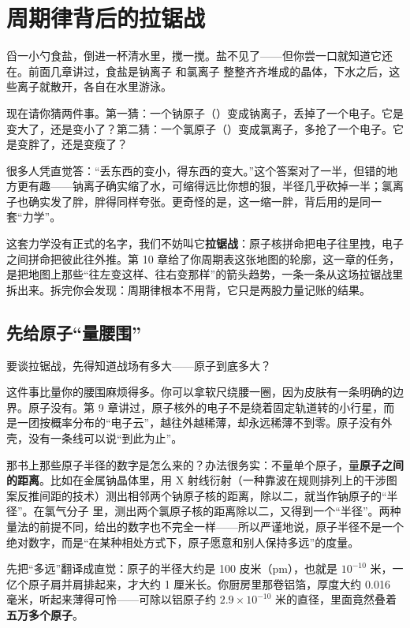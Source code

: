 \chapter{周期律背后的拉锯战}

\begin{kaichang}
舀一小勺食盐，倒进一杯清水里，搅一搅。盐不见了——但你尝一口就知道它还在。前面几章讲过，食盐是钠离子  和氯离子  整整齐齐堆成的晶体，下水之后，这些离子就散开，各自在水里游泳。

现在请你猜两件事。第一猜：一个钠原子（）变成钠离子，丢掉了一个电子。它是变大了，还是变小了？第二猜：一个氯原子（）变成氯离子，多抢了一个电子。它是变胖了，还是变瘦了？

很多人凭直觉答：“丢东西的变小，得东西的变大。”这个答案对了一半，但错的地方更有趣——钠离子确实缩了水，可缩得远比你想的狠，半径几乎砍掉一半；氯离子也确实发了胖，胖得同样夸张。更奇怪的是，这一缩一胖，背后用的是同一套“力学”。

这套力学没有正式的名字，我们不妨叫它\textbf{拉锯战}：原子核拼命把电子往里拽，电子之间拼命把彼此往外推。第 10 章给了你周期表这张地图的轮廓，这一章的任务，是把地图上那些“往左变这样、往右变那样”的箭头趋势，一条一条从这场拉锯战里拆出来。拆完你会发现：周期律根本不用背，它只是两股力量记账的结果。
\end{kaichang}

\section{先给原子“量腰围”}

要谈拉锯战，先得知道战场有多大——原子到底多大？

这件事比量你的腰围麻烦得多。你可以拿软尺绕腰一圈，因为皮肤有一条明确的边界。原子没有。第 9 章讲过，原子核外的电子不是绕着固定轨道转的小行星，而是一团按概率分布的“电子云”，越往外越稀薄，却永远稀薄不到零。原子没有外壳，没有一条线可以说“到此为止”。

那书上那些原子半径的数字是怎么来的？办法很务实：不量单个原子，量\textbf{原子之间的距离}。比如在金属钠晶体里，用 X 射线衍射（一种靠波在规则排列上的干涉图案反推间距的技术）测出相邻两个钠原子核的距离，除以二，就当作钠原子的“半径”。在氯气分子  里，测出两个氯原子核的距离除以二，又得到一个“半径”。两种量法的前提不同，给出的数字也不完全一样——所以严谨地说，原子半径不是一个绝对数字，而是“在某种相处方式下，原子愿意和别人保持多远”的度量。

先把“多远”翻译成直觉：原子的半径大约是 100 皮米（pm），也就是 $10^{-10}$ 米，一亿个原子肩并肩排起来，才大约 1 厘米长。你厨房里那卷铝箔，厚度大约 0.016 毫米，听起来薄得可怜——可除以铝原子约 $2.9\times 10^{-10}$ 米的直径，里面竟然叠着\textbf{五万多个原子}。

